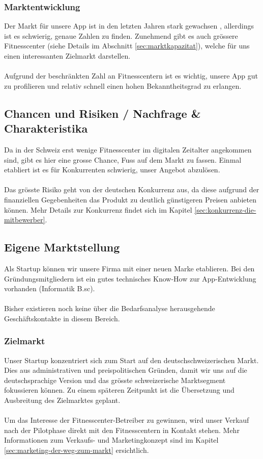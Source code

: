 \subsubsection{Marktentwicklung}
Der Markt für unsere App ist in den letzten Jahren stark gewachsen \cite{fitness-studios+1+milliarde}\cite{fitness+tribune}, allerdings ist es schwierig, genaue Zahlen zu finden. Zunehmend gibt es auch grössere Fitnesscenter (siehe Details im Abschnitt \ref{sec:marktkapazitat}), welche für uns einen interessanten Zielmarkt darstellen.
\\ \\
Aufgrund der beschränkten Zahl an Fitnesscentern ist es wichtig, unsere App gut zu profilieren und relativ schnell einen hohen Bekanntheitsgrad zu erlangen.

\subsection{Chancen und Risiken / Nachfrage \& Charakteristika}

Da in der Schweiz erst wenige Fitnesscenter im digitalen Zeitalter angekommen sind, gibt es hier eine grosse Chance, Fuss auf dem Markt zu fassen. Einmal etabliert ist es für Konkurrenten schwierig, unser Angebot abzulösen.
\\ \\
Das grösste Risiko geht von der deutschen Konkurrenz aus, da diese aufgrund der finanziellen Gegebenheiten das Produkt zu deutlich günstigeren Preisen anbieten können. Mehr Details zur Konkurrenz findet sich im Kapitel \ref{sec:konkurrenz-die-mitbewerber}.


\subsection{Eigene Marktstellung}

Als Startup können wir unsere Firma mit einer neuen Marke etablieren. Bei den Gründungsmitgliedern ist ein gutes technisches Know-How zur App-Entwicklung vorhanden (Informatik B.sc).
\\ \\
Bisher existieren noch keine über die Bedarfsanalyse herausgehende Geschäftskontakte in diesem Bereich.


\subsubsection{Zielmarkt}

Unser Startup konzentriert sich zum Start auf den deutschschweizerischen Markt. Dies aus administrativen und preispolitischen Gründen, damit wir uns auf die deutschsprachige Version und das grösste schweizerische Marktsegment fokussieren können. Zu einem späteren Zeitpunkt ist die Übersetzung und Ausbreitung des Zielmarktes geplant.
\\ \\
Um das Interesse der Fitnesscenter-Betreiber zu gewinnen, wird unser Verkauf nach der Pilotphase direkt mit den Fitnesscentern in Kontakt stehen. Mehr Informationen zum Verkaufs- und Marketingkonzept sind im Kapitel \ref{sec:marketing-der-weg-zum-markt} ersichtlich.


